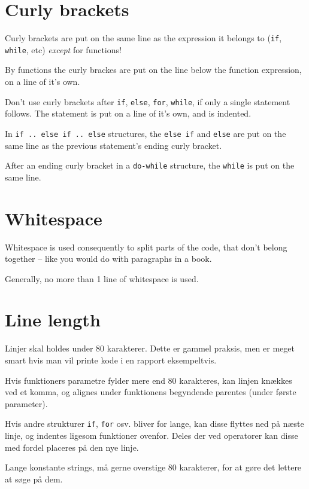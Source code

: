 \documentclass[article, 10pt]{memoir}
\let\tempone\itemize
\let\temptwo\enditemize
\renewenvironment{itemize}{\tempone\firmlist}{\temptwo}
\begin{document}
\begin{multicols}{2}
    \section{Curly brackets}
    \begin{itemize}
    \item Curly brackets are put on the same line as the expression it belongs to (\texttt{if}, \texttt{while}, etc) \emph{except} for functions!
    \item By functions the curly brackes are put on the line below the function expression, on a line of it's own.
    \item Don't use curly brackets after \texttt{if}, \texttt{else}, \texttt{for}, \texttt{while}, if only a single statement follows. The statement is put on a line of it's own, and is indented.
    \item In \texttt{if .. else if .. else} structures, the \texttt{else if} and \texttt{else} are put on the same line as the previous statement's ending curly bracket.
    \item After an ending curly bracket in a \texttt{do-while} structure, the \texttt{while} is put on the same line.
    \end{itemize}

    \section{Whitespace}
    \begin{itemize}
    \item Whitespace is used consequently to split parts of the code, that don't belong together -- like you would do with paragraphs in a book.
    \item Generally, no more than 1 line of whitespace is used.
    \end{itemize}

    \section{Line length}
    \begin{itemize}
    \item Linjer skal holdes under 80 karakterer. Dette er gammel praksis, men er meget smart hvis man vil printe kode i en rapport eksempeltvis.
    \item Hvis funktioners parametre fylder mere end 80 karakteres, kan linjen knækkes ved et komma, og alignes under funktionens begyndende parentes (under første parameter).
    \item Hvis andre strukturer \texttt{if}, \texttt{for} osv. bliver for lange, kan disse flyttes ned på næste linje, og indentes ligesom funktioner ovenfor. Deles der ved operatorer kan disse med fordel placeres på den nye linje.
    \item Lange konstante strings, må gerne overstige 80 karakterer, for at gøre det lettere at søge på dem.
    \end{itemize}


\end{multicols}
\end{document}
